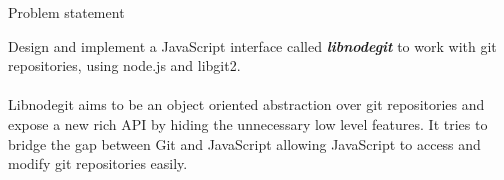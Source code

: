 \begin{center}
  {\huge Problem statement} \\[1.4cm]
\end{center}


Design and implement a JavaScript interface called \textit{\textbf{libnodegit}}
to work with git repositories, using node.js and libgit2. \\ \\

Libnodegit aims to be an object oriented abstraction over git repositories and
expose a new rich API by hiding the unnecessary low level features. It tries to
bridge the gap between Git and JavaScript allowing JavaScript to access and
modify git repositories easily.

